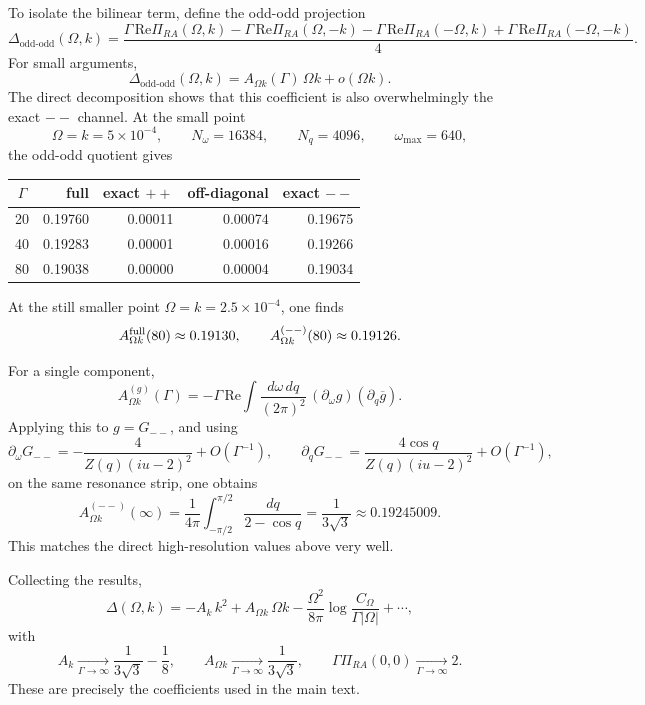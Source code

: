 \documentclass[aps,prx,preprint,amsmath,amssymb]{revtex4-2}
\renewcommand{\Re}{\text{Re}}
\begin{document}
To isolate the bilinear term, define the odd-odd projection
\begin{equation}\label{eq:Aomegak-oddodd-app}
\Delta_{\mathrm{odd\text{-}odd}}(\Omega,k)
=
\frac{
\Gamma\,\Re\Pi_{RA}(\Omega,k)
-\Gamma\,\Re\Pi_{RA}(\Omega,-k)
-\Gamma\,\Re\Pi_{RA}(-\Omega,k)
+\Gamma\,\Re\Pi_{RA}(-\Omega,-k)
}{4}.
\end{equation}
For small arguments,
\[
\Delta_{\mathrm{odd\text{-}odd}}(\Omega,k)
=
A_{\Omega k}(\Gamma)\,\Omega k+o(\Omega k).
\]
The direct decomposition shows that this coefficient is also overwhelmingly the
exact \(--\) channel.  At the small point
\[
\Omega=k=5\times10^{-4},
\qquad
N_\omega=16384,
\qquad
N_q=4096,
\qquad
\omega_{\max}=640,
\]
the odd-odd quotient gives
\begin{center}
\begin{tabular}{crrrr}
\toprule
\(\Gamma\) & full & exact \(++\) & off-diagonal & exact \(--\) \\
\midrule
20 & 0.19760 & 0.00011 & 0.00074 & 0.19675 \\
40 & 0.19283 & 0.00001 & 0.00016 & 0.19266 \\
80 & 0.19038 & 0.00000 & 0.00004 & 0.19034 \\
\bottomrule
\end{tabular}
\end{center}
At the still smaller point \(\Omega=k=2.5\times10^{-4}\), one finds
\[
A_{\Omega k}^{\rm full}(80)\approx 0.19130,
\qquad
A_{\Omega k}^{(--)}(80)\approx 0.19126.
\]

For a single component,
\begin{equation}
A_{\Omega k}^{(g)}(\Gamma)
=
-\Gamma\,\Re\!\int\frac{d\omega\,dq}{(2\pi)^2}\,
(\partial_\omega g)(\partial_q \overline g).
\end{equation}
Applying this to \(g=G_{--}\), and using
\[
\partial_\omega G_{--}
=
-\frac{4}{Z(q)(iu-2)^2}+O(\Gamma^{-1}),
\qquad
\partial_q G_{--}
=
\frac{4\cos q}{Z(q)(iu-2)^2}+O(\Gamma^{-1}),
\]
on the same resonance strip, one obtains
\begin{equation}\label{eq:Aomegak-final-app}
A_{\Omega k}^{(--)}(\infty)
=
\frac{1}{4\pi}\int_{-\pi/2}^{\pi/2}\frac{dq}{2-\cos q}
=
\frac{1}{3\sqrt3}
\approx 0.19245009.
\end{equation}
This matches the direct high-resolution values above very well.

Collecting the results,
\begin{equation}\label{eq:Delta-summary-app}
\Delta(\Omega,k)
=
-A_k\,k^2
+A_{\Omega k}\,\Omega k
-\frac{\Omega^2}{8\pi}\log\!\frac{C_\Omega}{\Gamma|\Omega|}
+\cdots,
\end{equation}
with
\begin{equation}
A_k\xrightarrow[\Gamma\to\infty]{}\frac{1}{3\sqrt3}-\frac18,
\qquad
A_{\Omega k}\xrightarrow[\Gamma\to\infty]{}\frac{1}{3\sqrt3},
\qquad
\Gamma\Pi_{RA}(0,0)\xrightarrow[\Gamma\to\infty]{}2.
\end{equation}
These are precisely the coefficients used in the main text.
\end{document}
